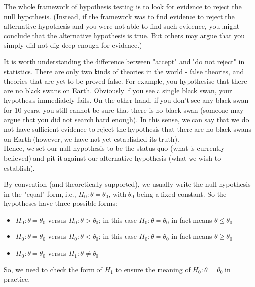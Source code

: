 The whole framework of hypothesis testing is to look for evidence to reject the null hypothesis. (Instead, if the framework was to find evidence to reject the alternative hypothesis and you were not able to find such evidence, you might conclude that the alternative hypothesis is true. But others may argue that you simply did not dig deep enough for evidence.) 
\begin{note}
\end{note}
It is worth understanding the difference between "accept" and "do not reject" in statistics. There are only two kinds of theories in the world - false theories, and theories that are yet to be proved false. For example, you hypothesise that there are no black swans on Earth. Obviously if you see a single black swan, your hypothesis immediately fails. On the other hand, if you don't see any black swan for 10 years, you still cannot be sure that there is no black swan (someone may argue that you did not search hard enough). In this sense, we can say that we do not have sufficient evidence to reject the hypothesis that there are no black swans on Earth (however, we have not yet established its truth). \\
Hence, we set our null hypothesis to be the status quo (what is currently believed) and pit it against our alternative hypothesis (what we wish to establish).
\begin{note}
\end{note}
By convention (and theoretically supported), we usually write the null hypothesis in the "equal" form, i.e., $H_0: \theta = \theta_0$, with $\theta_0$ being a fixed constant. So the hypotheses have three possible forms:
\begin{itemize}
    \item $H_0: \theta = \theta_0$ versus $H_0: \theta > \theta_0$; in this case $H_0: \theta = \theta_0$ in fact means $\theta \leq \theta_0$
    \item $H_0: \theta = \theta_0$ versus $H_0: \theta < \theta_0$; in this case $H_0: \theta = \theta_0$ in fact means $\theta \geq \theta_0$
    \item $H_0: \theta = \theta_0$ versus $H_1: \theta \neq \theta_0$
\end{itemize}
So, we need to check the form of $H_1$ to ensure the meaning of $H_0: \theta = \theta_0$ in practice.
